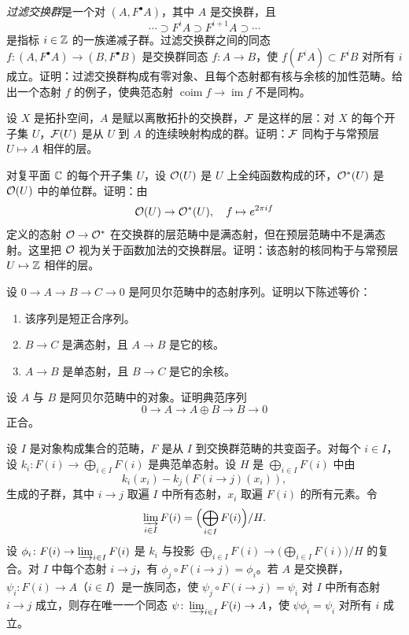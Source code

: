 \begin{exercises}
\item \label{ex:1.1.1} \emph{过滤交换群}是一个对 $(A,F^{\bullet}A)$，其中 $A$ 是交换群，且
\[
\cdots\supset F^iA\supset F^{i+1}A\supset\cdots
\]
是指标 $i\in\mathbb{Z}$ 的一族递减子群。过滤交换群之间的同态 $f\colon(A,F^{\bullet}A)\to(B,F^{\bullet}B)$ 是交换群同态 $f\colon A\to B$，使 $f(F^iA)\subset F^iB$ 对所有 $i$ 成立。证明：过滤交换群构成有零对象、且每个态射都有核与余核的加性范畴。给出一个态射 $f$ 的例子，使典范态射 $\operatorname{coim}f\to\operatorname{im}f$ 不是同构。

\item \label{ex:1.1.2} 设 $X$ 是拓扑空间，$A$ 是赋以离散拓扑的交换群，$\mathcal{F}$ 是这样的层：对 $X$ 的每个开子集 $U$，$\mathcal{F}(U)$ 是从 $U$ 到 $A$ 的连续映射构成的群。证明：$\mathcal{F}$ 同构于与常预层 $U\mapsto A$ 相伴的层。

\item \label{ex:1.1.3} 对复平面 $\mathbb{C}$ 的每个开子集 $U$，设 $\mathcal{O}(U)$ 是 $U$ 上全纯函数构成的环，$\mathcal{O}^*(U)$ 是 $\mathcal{O}(U)$ 中的单位群。证明：由
\[
\mathcal{O}(U)\to\mathcal{O}^*(U),\quad f\mapsto e^{2\pi if}
\]
定义的态射 $\mathcal{O}\to\mathcal{O}^*$ 在交换群的层范畴中是满态射，但在预层范畴中不是满态射。这里把 $\mathcal{O}$ 视为关于函数加法的交换群层。证明：该态射的核同构于与常预层 $U\mapsto\mathbb{Z}$ 相伴的层。

\item \label{ex:1.1.4} 设 $0\to A\to B\to C\to 0$ 是阿贝尔范畴中的态射序列。证明以下陈述等价：
\begin{enumerate}[label=(\arabic*),leftmargin=2.4em]
  \item 该序列是短正合序列。
  \item $B\to C$ 是满态射，且 $A\to B$ 是它的核。
  \item $A\to B$ 是单态射，且 $B\to C$ 是它的余核。
\end{enumerate}

\item \label{ex:1.1.5} 设 $A$ 与 $B$ 是阿贝尔范畴中的对象。证明典范序列
\[
0\to A\to A\oplus B\to B\to 0
\]
正合。

\item \label{ex:1.1.6} 设 $I$ 是对象构成集合的范畴，$F$ 是从 $I$ 到交换群范畴的共变函子。对每个 $i\in I$，设 $k_i\colon F(i)\to\bigoplus_{i\in I}F(i)$ 是典范单态射。设 $H$ 是 $\bigoplus_{i\in I}F(i)$ 中由
\[
k_i(x_i)-k_j(F(i\to j)(x_i)),
\]
生成的子群，其中 $i\to j$ 取遍 $I$ 中所有态射，$x_i$ 取遍 $F(i)$ 的所有元素。令
\[
\varinjlim_{i\in I}F(i)=\Bigl(\bigoplus_{i\in I}F(i)\Bigr)/H.
\]
设 $\phi_i\colon F(i)\to\varinjlim_{i\in I}F(i)$ 是 $k_i$ 与投影 $\bigoplus_{i\in I}F(i)\to\bigl(\bigoplus_{i\in I}F(i)\bigr)/H$ 的复合。对 $I$ 中每个态射 $i\to j$，有 $\phi_j\circ F(i\to j)=\phi_i$。若 $A$ 是交换群，$\psi_i\colon F(i)\to A$（$i\in I$）是一族同态，使 $\psi_j\circ F(i\to j)=\psi_i$ 对 $I$ 中所有态射 $i\to j$ 成立，则存在唯一一个同态 $\psi\colon\varinjlim_{i\in I}F(i)\to A$，使 $\psi\phi_i=\psi_i$ 对所有 $i$ 成立。


\end{exercises}
